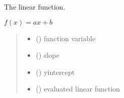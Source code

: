 \documentclass[letterpaper,10pt,english]{sphinxmanual}
\begin{document}
\begin{fulllineitems}
\label{\detokenize{01_utils:skinoptics.utils.linear}}
\pysigstartsignatures
{}
\pysigstopsignatures
\sphinxAtStartPar
The linear function.

\sphinxAtStartPar
\(f(x) = ax + b\)
\begin{quote}\begin{description}
\begin{itemize}
\item {} 
\sphinxAtStartPar
{} () \textendash{} function variable

\item {} 
\sphinxAtStartPar
{} () \textendash{} slope

\item {} 
\sphinxAtStartPar
{} () \textendash{} y\sphinxhyphen{}intercept

\end{itemize}

\sphinxAtStartPar
\begin{itemize}
\item {} 
\sphinxAtStartPar
{} () \textendash{} evaluated linear function

\end{itemize}


\end{description}\end{quote}

\end{fulllineitems}

\end{document}
